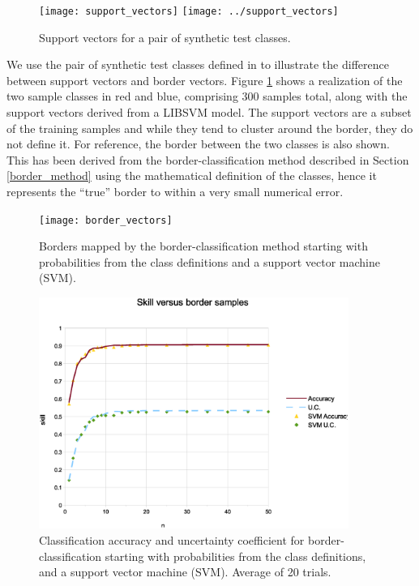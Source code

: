 \label{example}

\begin{figure}
  \ifsubmit
    \texttt{[image: support\_vectors]}
  \else
    \texttt{[image: ../support\_vectors]}
  \fi
  \caption{Support vectors for a pair of synthetic test classes.}\label{sample_sv}
\end{figure}

We use the pair of synthetic test classes defined in \citet{Mills2011} to 
illustrate the difference between support vectors and border vectors.
Figure \ref{sample_sv} shows a realization of the two sample classes 
in red and blue, comprising 300 samples total, along
with the support vectors derived from a LIBSVM model.
The support vectors are a subset of the training samples and while they
tend to cluster around the border, they do not define it.
For reference, the border between the two classes is also shown.
This has been derived from the border-classification method described in 
Section \ref{border_method} using the mathematical definition of the classes,
hence it represents the ``true'' border to within a very small numerical error.

\begin{figure}
\texttt{[image: border\_vectors]}
\caption{Borders mapped by the border-classification method starting with probabilities from the class definitions and a support vector machine (SVM).}
\label{border_vectors}
\end{figure}

\begin{figure}
\includegraphics[width=0.9\textwidth]{skill_vs_nb}
\caption{Classification accuracy and uncertainty coefficient for border-classification starting with probabilities from the class definitions, and a support vector machine (SVM). Average of 20 trials.}
\label{skill_v_nb}
\end{figure}

